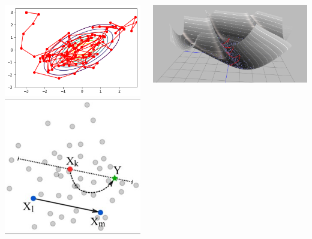 \documentclass[aspectratio=169,handout]{beamer}
\begin{document}
\begin{frame}
\begin{columns}
\begin{columns}
        \includegraphics[width=\textwidth]{figures/metropolis-hastings}
        \includegraphics[width=\textwidth]{figures/zeus}
        \end{columns}
        \includegraphics[width=\textwidth]{figures/hmc_explained}
    \end{columns}
\end{frame}
\end{document}
